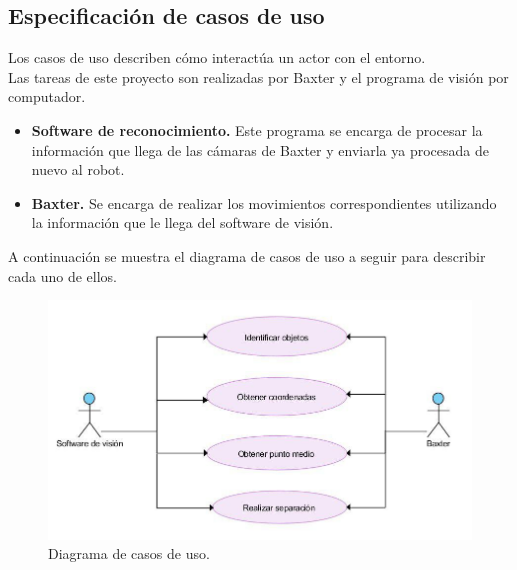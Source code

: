 \subsection{Especificación de casos de uso}
\noindent Los casos de uso describen cómo interactúa un actor con el entorno.\cite{cu} \\
\noindent Las tareas de este proyecto son realizadas por Baxter y el programa de visión por computador.
\begin{itemize}
	\item \textbf{Software de reconocimiento.} Este programa se encarga de procesar la información que llega de las cámaras de Baxter y enviarla ya procesada de nuevo al robot.
	\item \textbf{Baxter.} Se encarga de realizar los movimientos correspondientes utilizando la información que le llega del software de visión. \\
\end{itemize}

\noindent A continuación se muestra el diagrama de casos de uso a seguir para describir cada uno de ellos. \\

\begin{figure}[!h]
	\label{cd:cud}
	\includegraphics[scale=0.6]{imagenes/cud.jpg}
	\caption{Diagrama de casos de uso.}
\end{figure}


